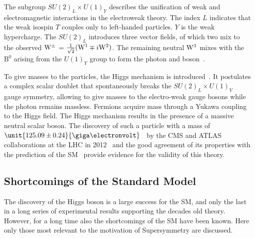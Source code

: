 The subgroup $SU(2)_L \times U(1)_Y$ describes the unification of weak and electromagnetic interactions in the electroweak theory. The index $L$ indicates that the weak isospin $T$ couples only to left-handed particles. $Y$ is the weak hypercharge. The $SU(2)_L$ introduces three vector fields, of which two mix to the observed $\mathrm{W}^{\pm}$ = $\frac{1}{\sqrt{2}}(\mathrm{W}^1\mp i\mathrm{W}^2)$. The remaining neutral $\mathrm{W}^3$ mixes with the $\mathrm{B}^0$ arising from the $U(1)_Y$ group to form the photon and \Z boson~\cite{HalzenMartin}.

To give masses to the particles, the Higgs mechanism is introduced~\cite{PhysRevLett.13.508,PhysRevLett.13.321,PhysRevLett.13.585}. It postulates a complex scalar doublet that spontaneously breaks the $SU(2)_L \times U(1)_Y$ gauge symmetry, allowing to give masses to the electro-weak gauge bosons while the photon remains massless. Fermions acquire mass through a Yukawa coupling to the Higgs field. The Higgs mechanism results in the presence of a massive neutral scalar boson. The discovery of such a particle with a mass of $\unit{125.09\pm0.24}{\giga\electronvolt}$~\cite{Aad:2015zhl} by the CMS and ATLAS collaborations at the LHC in 2012~\cite{Chatrchyan:2012ufa,Aad:2012tfa} and the good agreement of its properties with the prediction of the SM~\cite{Khachatryan:2014jba} provide evidence for the validity of this theory.   

\subsection*{Shortcomings of the Standard Model}
The discovery of the Higgs boson is a large success for the SM, and only the last in a long series of experimental results supporting the decades old theory. However, for a long time also the shortcomings of the SM have been known. Here only those most relevant to the motivation of Supersymmetry are discussed.

